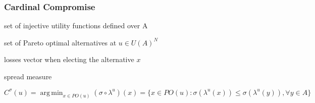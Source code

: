\documentclass{beamer}
\newcommand{\paretopt}{\mathit{PO}}
\DeclareMathOperator*{\argmin}{arg\,min}
\begin{document}
\begin{frame}
	\frametitle{Cardinal Compromise}
	\begin{description}[$PO(u) \qquad $]
		\item[$U(A)^N$] set of injective utility functions defined	over A
		\item[$PO(u)$] set of Pareto optimal alternatives at {\color{blue}$u \in U(A)^N$}
		\item[$\lambda ^{u}(x)$] losses vector when electing the alternative $x$
		\item[$\sigma$] spread measure
	\end{description}
	 \begin{block}{}
		\[ C^{\sigma }(u) = \argmin_{x \in \paretopt(u)} (\sigma \circ \lambda^u)(x) = \{ x\in \paretopt(u):\sigma (\lambda ^{u}(x))\leq \sigma (\lambda ^{u}(y)),  \forall y\in A\} \]
	\end{block}
\end{frame}
\end{document}
